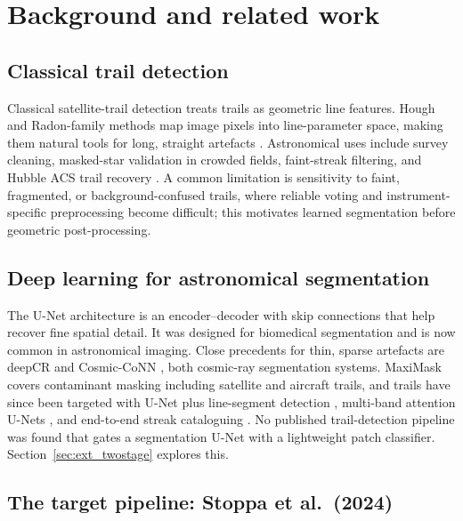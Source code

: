 \documentclass{cam-thesis}
\begin{document}
\section{Background and related work}
\label{sec:related}


\subsection{Classical trail detection}
\label{sec:related_classical}

Classical satellite-trail detection treats trails as geometric line
features. Hough and Radon-family methods map image pixels into line-parameter
space, making them natural tools for long, straight artefacts
\citep{hough1962,duda1972,matas2000}. Astronomical uses include survey
cleaning, masked-star validation in crowded fields, faint-streak
filtering, and Hubble ACS trail recovery
\citep{storkey2004,bektesevic2017,nir2018,stark2026}.
A common limitation is sensitivity to faint, fragmented, or
background-confused trails, where reliable voting and instrument-specific
preprocessing become difficult; this motivates learned segmentation before
geometric post-processing.

\subsection{Deep learning for astronomical segmentation}
\label{sec:related_dl}

The U-Net architecture \citep{ronneberger2015} is an encoder--decoder with skip
connections that help recover fine spatial detail. It was designed for
biomedical segmentation and is now common in astronomical imaging. Close
precedents for thin, sparse artefacts are deepCR \citep{zhang2020} and Cosmic-CoNN
\citep{xu2023}, both cosmic-ray segmentation systems. MaxiMask
\citep{paillassa2020} covers contaminant masking including satellite and
aircraft trails, and trails have since been targeted with U-Net plus
line-segment detection \citep{chen2025}, multi-band attention U-Nets
\citep{yu2025}, and end-to-end streak cataloguing \citep{carrillo2026}. No
published trail-detection pipeline was found that gates a segmentation U-Net
with a lightweight patch classifier. Section~\ref{sec:ext_twostage} explores this.

\subsection{The target pipeline: Stoppa et al.\ (2024)}
\label{sec:related_target}
\end{document}
